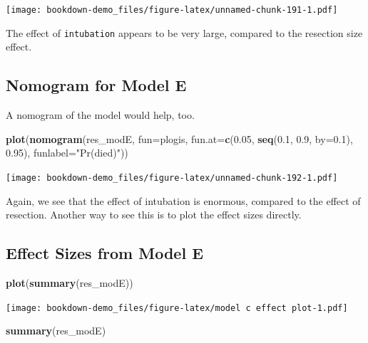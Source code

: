 \documentclass[]{book}
\newenvironment{Shaded}{\begin{snugshade}}{\end{snugshade}}
\newcommand{\KeywordTok}[1]{\textcolor[rgb]{0.13,0.29,0.53}{\textbf{#1}}}
\newcommand{\DataTypeTok}[1]{\textcolor[rgb]{0.13,0.29,0.53}{#1}}
\newcommand{\FloatTok}[1]{\textcolor[rgb]{0.00,0.00,0.81}{#1}}
\newcommand{\StringTok}[1]{\textcolor[rgb]{0.31,0.60,0.02}{#1}}
\newcommand{\NormalTok}[1]{#1}
\theoremstyle{definition}
\theoremstyle{definition}
\theoremstyle{definition}
\theoremstyle{remark}
\begin{document}
\texttt{[image: bookdown-demo\_files/figure-latex/unnamed-chunk-191-1.pdf]}

The effect of \texttt{intubation} appears to be very large, compared to
the resection size effect.

\subsection{Nomogram for Model E}\label{nomogram-for-model-e}

A nomogram of the model would help, too.

\begin{Shaded}
\begin{Highlighting}[]
\KeywordTok{plot}\NormalTok{(}\KeywordTok{nomogram}\NormalTok{(res_modE, }\DataTypeTok{fun=}\NormalTok{plogis, }
              \DataTypeTok{fun.at=}\KeywordTok{c}\NormalTok{(}\FloatTok{0.05}\NormalTok{, }\KeywordTok{seq}\NormalTok{(}\FloatTok{0.1}\NormalTok{, }\FloatTok{0.9}\NormalTok{, }\DataTypeTok{by=}\FloatTok{0.1}\NormalTok{), }\FloatTok{0.95}\NormalTok{), }
              \DataTypeTok{funlabel=}\StringTok{"Pr(died)"}\NormalTok{))}
\end{Highlighting}
\end{Shaded}

\texttt{[image: bookdown-demo\_files/figure-latex/unnamed-chunk-192-1.pdf]}

Again, we see that the effect of intubation is enormous, compared to the
effect of resection. Another way to see this is to plot the effect sizes
directly.

\subsection{Effect Sizes from Model E}\label{effect-sizes-from-model-e}

\begin{Shaded}
\begin{Highlighting}[]
\KeywordTok{plot}\NormalTok{(}\KeywordTok{summary}\NormalTok{(res_modE))}
\end{Highlighting}
\end{Shaded}

\texttt{[image: bookdown-demo\_files/figure-latex/model c effect plot-1.pdf]}

\begin{Shaded}
\begin{Highlighting}[]
\KeywordTok{summary}\NormalTok{(res_modE)}
\end{Highlighting}
\end{Shaded}
\end{document}
